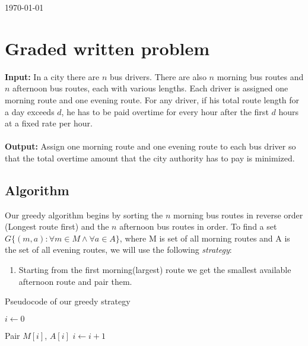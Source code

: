 \documentclass[8pt]{article}
\begin{document}
\hfill \small{\today} \\
\setlength{\fboxrule}{.5mm}\setlength{\fboxsep}{1.2mm}
\newlength{\boxlength}\setlength{\boxlength}{\textwidth}
\addtolength{\boxlength}{-4mm}
\begin{center}\end{center}
\vspace{5mm}

\section{Graded written problem}

\textbf{Input:} In a city there are $n$ bus drivers. There are also $n$ morning bus routes and $n$ afternoon bus routes, each with various lengths. Each driver is assigned one morning route
and one evening route. For any driver, if his total route length for a day exceeds $d$, he has to
be paid overtime for every hour after the first $d$ hours at a fixed rate per hour.
\\ \\
\textbf{Output:} Assign one morning route and one evening route to each bus driver so that the total overtime amount that the city authority has to pay is minimized.

\subsection{Algorithm}
Our greedy algorithm begins by sorting the $n$ morning bus routes in reverse order (Longest route first) and the $n$ afternoon bus routes in order. To find a set $G\{(m,a): \forall m \in M \land \forall a \in A \}$, where M is set of all morning routes and A is the set of all evening routes, we will use the following \textit{strategy}:
\begin{enumerate}
    \item Starting from the first morning(largest) route we get the smallest available afternoon route and pair them.
\end{enumerate}


\begin{algorithm}
\caption{Pseudocode of our greedy strategy}\label{euclid}
\begin{algorithmic}[1]

\State $i \leftarrow 0$

        \State Pair $M[i]$, $A[i]$
        \State $i \leftarrow i + 1$
\EndWhile
\EndProcedure
\end{algorithmic}
\end{algorithm}
\end{document}
